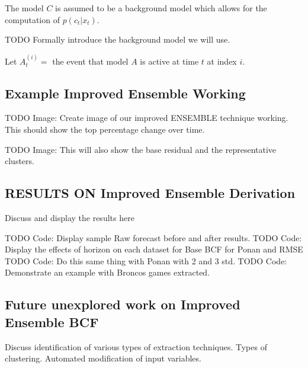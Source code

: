 The model $C$ is assumed to be a background model which allows for the computation of $p(c_{t}|x_{t})$.  

TODO Formally introduce the background model we will use.

Let $A_{t}^{(i)} = $ the event that model $A$ is active at time $t$ at index $i$.  





\subsection{Example Improved Ensemble Working}
TODO Image: Create image of our improved ENSEMBLE technique working.  This should show the top percentage change over time.

TODO Image: This will also show the base residual and the representative clusters.

\subsection{RESULTS ON Improved Ensemble Derivation}
Discuss and display the results here

TODO Code: Display sample Raw forecast before and after results.
TODO Code: Display the effects of horizon on each dataset for Base BCF for Ponan and RMSE
TODO Code: Do this same thing with Ponan with 2 and 3 std.
TODO Code: Demonstrate an example with Broncos games extracted.

\subsection{Future unexplored work on Improved Ensemble BCF}
Discuss identification of various types of extraction techniques.  Types of clustering.  Automated modification of input variables.

